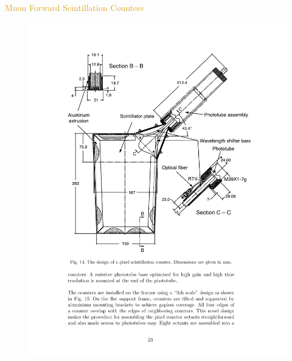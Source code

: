 \begin{frame}{\textcolor{Goldenrod}{Muon Forward Scintillation Counters}}
  \begin{overlayarea}{\textwidth}{\textheight}
    \begin{figure}[h]\centering
      \includegraphics[height=0.65\textheight]{./Images/47_MD_forward_pixels_02.pdf}

\end{figure}
\end{overlayarea}
\end{frame}
